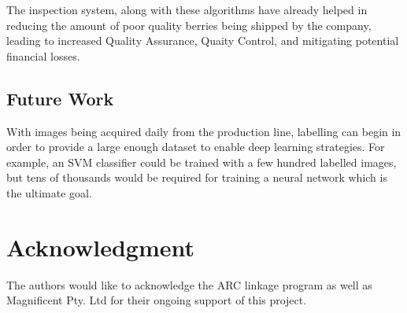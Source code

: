\documentclass[conference]{IEEEtran}
\begin{document}
The inspection system, along with these algorithms have already helped in reducing the amount of poor quality berries being shipped by the company, leading to increased Quality Assurance, Quaity Control, and mitigating potential financial losses.


\subsection{Future Work}


With images being acquired daily from the production line, labelling can begin in order to provide a large enough dataset to enable deep learning strategies. For example, an SVM classifier could be trained with a few hundred labelled images, but tens of thousands would be required for training a neural network which is the ultimate goal. 



   






\section*{Acknowledgment}

The authors would like to acknowledge the ARC linkage program as well as Magnificent Pty. Ltd for their ongoing support of this project. 




\end{document}
